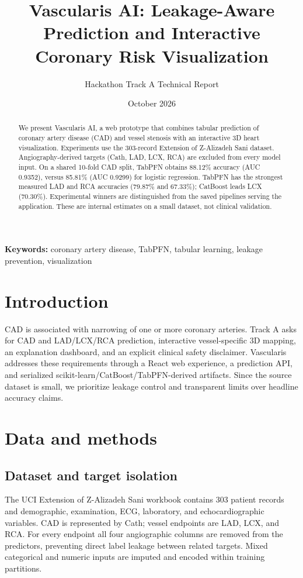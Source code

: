 \documentclass[9pt,twocolumn]{article}
\title{Vascularis AI: Leakage-Aware Prediction and Interactive Coronary Risk Visualization}
\author{Hackathon Track A Technical Report}
\date{October 2026}
\begin{document}
\maketitle
\begin{abstract}
We present Vascularis AI, a web prototype that combines tabular prediction of coronary artery disease (CAD) and vessel stenosis with an interactive 3D heart visualization. Experiments use the 303-record Extension of Z-Alizadeh Sani dataset. Angiography-derived targets (Cath, LAD, LCX, RCA) are excluded from every model input. On a shared 10-fold CAD split, TabPFN obtains 88.12\% accuracy (AUC 0.9352), versus 85.81\% (AUC 0.9299) for logistic regression. TabPFN has the strongest measured LAD and RCA accuracies (79.87\% and 67.33\%); CatBoost leads LCX (70.30\%). Experimental winners are distinguished from the saved pipelines serving the application. These are internal estimates on a small dataset, not clinical validation.
\end{abstract}
\noindent\textbf{Keywords:} coronary artery disease, TabPFN, tabular learning, leakage prevention, visualization
\section{Introduction}
CAD is associated with narrowing of one or more coronary arteries. Track A asks for CAD and LAD/LCX/RCA prediction, interactive vessel-specific 3D mapping, an explanation dashboard, and an explicit clinical safety disclaimer. Vascularis addresses these requirements through a React web experience, a prediction API, and serialized scikit-learn/CatBoost/TabPFN-derived artifacts. Since the source dataset is small, we prioritize leakage control and transparent limits over headline accuracy claims.
\section{Data and methods}
\subsection{Dataset and target isolation}
The UCI Extension of Z-Alizadeh Sani workbook contains 303 patient records and demographic, examination, ECG, laboratory, and echocardiographic variables. CAD is represented by Cath; vessel endpoints are LAD, LCX, and RCA. For every endpoint all four angiographic columns are removed from the predictors, preventing direct label leakage between related targets. Mixed categorical and numeric inputs are imputed and encoded within training partitions.
\end{document}
